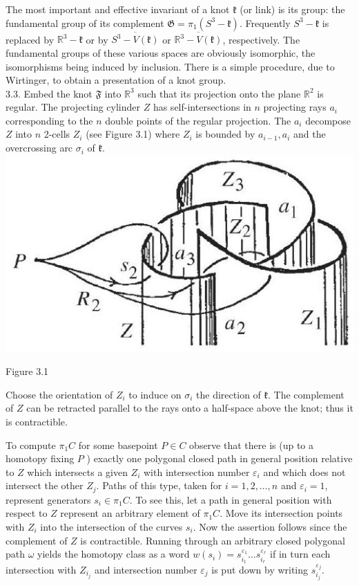 \documentclass[10pt, letterpaper]{article}
\begin{document}
The most important and effective invariant of a knot $\mathfrak{k}$ (or link) is its group: the fundamental group of its complement $\mathfrak{G}=\pi_{1}\left(S^{3}-\mathfrak{k}\right)$. Frequently $S^{3}-\mathfrak{k}$ is replaced by $\mathbb{R}^{3}-\mathfrak{k}$ or by $\overline{S^{3}-V(\mathfrak{k})}$ or $\overline{\mathbb{R}^{3}-V(\mathfrak{k})}$, respectively. The fundamental groups of these various spaces are obviously isomorphic, the isomorphisms being induced by inclusion. There is a simple procedure, due to Wirtinger, to obtain a presentation of a knot group.\\
3.3. Embed the knot $\mathfrak{F}$ into $\mathbb{R}^{3}$ such that its projection onto the plane $\mathbb{R}^{2}$ is regular. The projecting cylinder $Z$ has self-intersections in $n$ projecting rays $a_{i}$ corresponding to the $n$ double points of the regular projection. The $a_{i}$ decompose $Z$ into $n$ 2-cells $Z_{i}$ (see Figure 3.1) where $Z_{i}$ is bounded by $a_{i-1}, a_{i}$ and the overcrossing arc $\sigma_{i}$ of $\mathfrak{k}$.\\
\includegraphics[scale=0.2, center]{2025_05_21_9c06be8de7a55410f8c1g-046}

Figure 3.1

Choose the orientation of $Z_{i}$ to induce on $\sigma_{i}$ the direction of $\mathfrak{k}$. The complement of $Z$ can be retracted parallel to the rays onto a half-space above the knot; thus it is contractible.

To compute $\pi_{1} C$ for some basepoint $P \in C$ observe that there is (up to a homotopy fixing $P$ ) exactly one polygonal closed path in general position relative to $Z$ which intersects a given $Z_{i}$ with intersection number $\varepsilon_{i}$ and which does not intersect the other $Z_{j}$. Paths of this type, taken for $i=1,2, \ldots, n$ and $\varepsilon_{i}=1$, represent generators $s_{i} \in \pi_{1} C$. To see this, let a path in general position with respect to $Z$ represent an arbitrary element of $\pi_{1} C$. Move its intersection points with $Z_{i}$ into the intersection of the curves $s_{i}$. Now the assertion follows since the complement of $Z$ is contractible. Running through an arbitrary closed polygonal path $\omega$ yields the homotopy class as a word $w\left(s_{i}\right)=s_{i_{1}}^{\varepsilon_{1}} \ldots s_{i_{r}}^{\varepsilon_{r}}$ if in turn each intersection with $Z_{i_{j}}$ and intersection number $\varepsilon_{j}$ is put down by writing $s_{i_{j}}^{\varepsilon_{j}}$.
\end{document}
